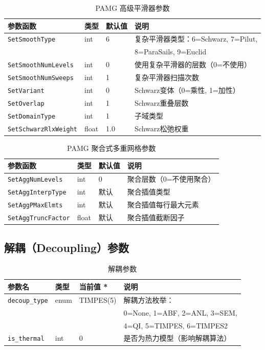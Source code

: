 \documentclass[12pt,a4paper]{article}
\begin{document}
\begin{table}[htbp]
\centering
\caption{PAMG 高级平滑器参数}
\label{tab:params_pamg_smooth}
\begin{tabular}{llll}
\toprule
参数函数 & 类型 & 默认值 & 说明 \\
\midrule
\texttt{SetSmoothType} & int & 6 & 复杂平滑器类型：6=Schwarz, 7=Pilut, \\
  &   &   & 8=ParaSails, 9=Euclid \\
\texttt{SetSmoothNumLevels} & int & 0 & 使用复杂平滑器的层数（0=不使用） \\
\texttt{SetSmoothNumSweeps} & int & 1 & 复杂平滑器扫描次数 \\
\texttt{SetVariant} & int & 0 & Schwarz变体（0=乘性, 1=加性） \\
\texttt{SetOverlap} & int & 1 & Schwarz重叠层数 \\
\texttt{SetDomainType} & int & 1 & 子域类型 \\
\texttt{SetSchwarzRlxWeight} & float & 1.0 & Schwarz松弛权重 \\
\bottomrule
\end{tabular}
\end{table}

\begin{table}[htbp]
\centering
\caption{PAMG 聚合式多重网格参数}
\label{tab:params_pamg_agg}
\begin{tabular}{llll}
\toprule
参数函数 & 类型 & 默认值 & 说明 \\
\midrule
\texttt{SetAggNumLevels} & int & 0 & 聚合层数（0=不使用聚合） \\
\texttt{SetAggInterpType} & int & 默认 & 聚合插值类型 \\
\texttt{SetAggPMaxElmts} & int & 默认 & 聚合插值每行最大元素 \\
\texttt{SetAggTruncFactor} & float & 默认 & 聚合插值截断因子 \\
\bottomrule
\end{tabular}
\end{table}

\subsection{解耦（Decoupling）参数}

\begin{table}[htbp]
\centering
\caption{解耦参数}
\label{tab:params_decoup}
\begin{tabular}{llll}
\toprule
参数名 & 类型 & 当前值 * & 说明 \\
\midrule
\texttt{decoup\_type} & enum & TIMPES(5) & 解耦方法枚举： \\
  &   &   & 0=None, 1=ABF, 2=ANL, 3=SEM,  \\
  &   &   & 4=QI, 5=TIMPES, 6=TIMPES2 \\
\texttt{is\_thermal} & int & 0 & 是否为热力模型（影响解耦算法） \\
\bottomrule
\end{tabular}
\end{table}
\end{document}
